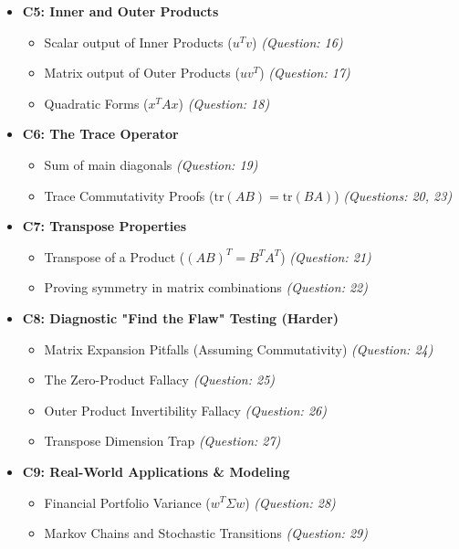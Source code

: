 \documentclass[11pt]{article}
\begin{document}
\begin{itemize}
    \item \textbf{C5: Inner and Outer Products}
    \begin{itemize}
        \item Scalar output of Inner Products ($u^T v$) \textit{(Question: 16)}
        \item Matrix output of Outer Products ($u v^T$) \textit{(Question: 17)}
        \item Quadratic Forms ($x^T A x$) \textit{(Question: 18)}
    \end{itemize}

    \item \textbf{C6: The Trace Operator}
    \begin{itemize}
        \item Sum of main diagonals \textit{(Question: 19)}
        \item Trace Commutativity Proofs ($\text{tr}(AB) = \text{tr}(BA)$) \textit{(Questions: 20, 23)}
    \end{itemize}

    \item \textbf{C7: Transpose Properties}
    \begin{itemize}
        \item Transpose of a Product ($(AB)^T = B^T A^T$) \textit{(Question: 21)}
        \item Proving symmetry in matrix combinations \textit{(Question: 22)}
    \end{itemize}

    \item \textbf{C8: Diagnostic "Find the Flaw" Testing (Harder)}
    \begin{itemize}
        \item Matrix Expansion Pitfalls (Assuming Commutativity) \textit{(Question: 24)}
        \item The Zero-Product Fallacy \textit{(Question: 25)}
        \item Outer Product Invertibility Fallacy \textit{(Question: 26)}
        \item Transpose Dimension Trap \textit{(Question: 27)}
    \end{itemize}

    \item \textbf{C9: Real-World Applications \& Modeling}
    \begin{itemize}
        \item Financial Portfolio Variance ($w^T \Sigma w$) \textit{(Question: 28)}
        \item Markov Chains and Stochastic Transitions \textit{(Question: 29)}
    \end{itemize}
\end{itemize}
\end{document}
